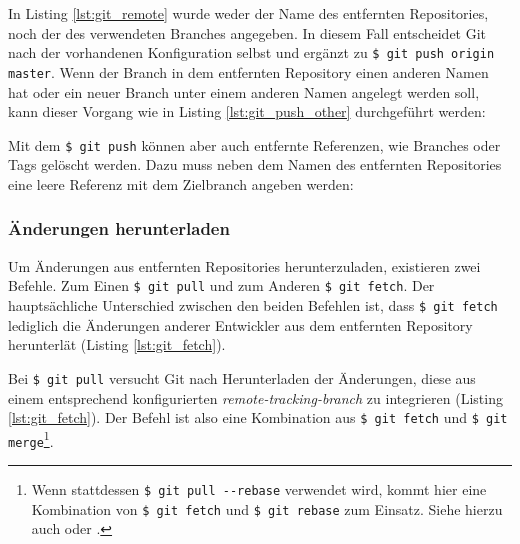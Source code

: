
In Listing \ref{lst:git_remote} wurde weder der Name des entfernten Repositories,
noch der des verwendeten Branches angegeben. In diesem Fall entscheidet Git
nach der vorhandenen Konfiguration selbst und ergänzt zu \texttt{\$ git
push origin master}. Wenn der Branch in dem entfernten Repository einen anderen
Namen hat oder ein neuer Branch unter einem anderen Namen angelegt werden soll,
kann dieser Vorgang wie in Listing \ref{lst:git_push_other} durchgeführt werden:


Mit dem \texttt{\$ git push} können aber auch entfernte Referenzen, wie
Branches oder Tags gelöscht werden. Dazu muss neben dem Namen des entfernten
Repositories eine leere Referenz mit dem Zielbranch angeben werden:
 \cite[S.~153-155]{gitosp}


\subsubsection{Änderungen herunterladen}
Um Änderungen aus entfernten Repositories herunterzuladen, existieren zwei
Befehle. Zum Einen \texttt{\$ git pull} und zum Anderen \texttt{\$ git fetch}.
Der hauptsächliche Unterschied zwischen den beiden Befehlen ist, dass
\texttt{\$ git fetch} lediglich die Änderungen anderer Entwickler aus dem entfernten
Repository herunterlät (Listing \ref{lst:git_fetch}).


Bei \texttt{\$ git pull} versucht Git nach Herunterladen der
Änderungen, diese aus einem entsprechend konfigurierten
\textit{remote-tracking-branch} zu integrieren (Listing \ref{lst:git_fetch}).
Der Befehl ist also eine Kombination aus \texttt{\$ git fetch} und \texttt{\$
git merge}\footnote{Wenn stattdessen \texttt{\$ git pull -{}-{}rebase} verwendet
wird, kommt hier eine Kombination von \texttt{\$ git fetch} und \texttt{\$ git
rebase} zum Einsatz. Siehe hierzu auch \cite[144-152]{gitosp} oder
\cite[85-88]{progit}.}. \cite[144-152]{gitosp}


